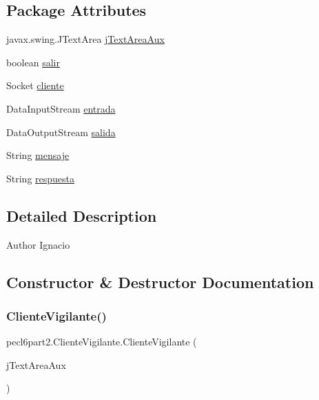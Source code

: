 \subsection*{Package Attributes}
\begin{DoxyCompactItemize}
\item 
javax.\+swing.\+J\+Text\+Area \mbox{\hyperlink{classpecl6part2_1_1_cliente_vigilante_a1a8bbb57af057f85a3d16d5371bd747f}{j\+Text\+Area\+Aux}}
\item 
boolean \mbox{\hyperlink{classpecl6part2_1_1_cliente_vigilante_a7d843ed5f4b8e8b1d9c12b45f6a75000}{salir}}
\item 
Socket \mbox{\hyperlink{classpecl6part2_1_1_cliente_vigilante_a86ec03929e1c3324e42f83c4b49d0273}{cliente}}
\item 
Data\+Input\+Stream \mbox{\hyperlink{classpecl6part2_1_1_cliente_vigilante_a499bca1b04f77132adcfa07ee2b9981c}{entrada}}
\item 
Data\+Output\+Stream \mbox{\hyperlink{classpecl6part2_1_1_cliente_vigilante_a2ae49bc25f90bbe7af39d0e8886345d3}{salida}}
\item 
String \mbox{\hyperlink{classpecl6part2_1_1_cliente_vigilante_a65c9ba203ade071cab56dc1c3b4c6547}{mensaje}}
\item 
String \mbox{\hyperlink{classpecl6part2_1_1_cliente_vigilante_ab9d336a0f81bb0be84e1b56a48f73f34}{respuesta}}
\end{DoxyCompactItemize}


\subsection{Detailed Description}
\begin{DoxyAuthor}{Author}
Ignacio 
\end{DoxyAuthor}


\subsection{Constructor \& Destructor Documentation}
\mbox{\label{classpecl6part2_1_1_cliente_vigilante_a2ba9f0dd667c95448bbbf3fe0cfccfcf}} 
\subsubsection{\texorpdfstring{Cliente\+Vigilante()}{ClienteVigilante()}}
{\footnotesize\ttfamily pecl6part2.\+Cliente\+Vigilante.\+Cliente\+Vigilante (\begin{DoxyParamCaption}\item[{javax.\+swing.\+J\+Text\+Area}]{j\+Text\+Area\+Aux }\end{DoxyParamCaption})\hspace{0.3cm}{\ttfamily [inline]}}


